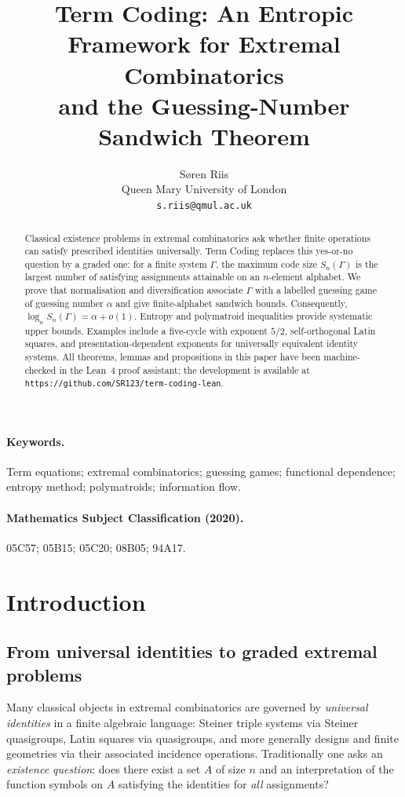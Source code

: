 \documentclass[11pt]{article}
\title{Term Coding: An Entropic Framework for Extremal Combinatorics\\
and the Guessing-Number Sandwich Theorem}
\author{S{\o}ren Riis\\
Queen Mary University of London\\
\texttt{s.riis@qmul.ac.uk}}
\date{}
\theoremstyle{plain}
\theoremstyle{definition}
\theoremstyle{definition}
\theoremstyle{remark}
\newcommand{\A}{A}
\newcommand{\Sn}{S_n}
\begin{document}
\maketitle

\begin{abstract}
Classical existence problems in extremal combinatorics ask whether finite operations can satisfy prescribed
identities universally. Term Coding replaces this yes-or-no question by a graded one: for a finite system $\Gamma$,
the maximum code size $\Sn(\Gamma)$ is the largest number of satisfying assignments attainable on an $n$-element
alphabet. We prove that normalisation and diversification associate $\Gamma$ with a labelled guessing game of
guessing number $\alpha$ and give finite-alphabet sandwich bounds. Consequently,
$\log_n \Sn(\Gamma)=\alpha+o(1)$. Entropy and polymatroid inequalities provide systematic upper bounds.
Examples include a five-cycle with exponent $5/2$, self-orthogonal Latin squares, and presentation-dependent
exponents for universally equivalent identity systems.
All theorems, lemmas and propositions in this paper have been machine-checked in the Lean~4
proof assistant; the development is available at
\nolinkurl{https://github.com/SR123/term-coding-lean}.
\end{abstract}

\paragraph{Keywords.}
Term equations; extremal combinatorics; guessing games; functional dependence; entropy method; polymatroids;
information flow.

\paragraph{Mathematics Subject Classification (2020).}
05C57; 05B15; 05C20; 08B05; 94A17.

\section{Introduction}
\label{sec:intro}

\subsection{From universal identities to graded extremal problems}

Many classical objects in extremal combinatorics are governed by \emph{universal identities} in a
finite algebraic language: Steiner triple systems via Steiner quasigroups, Latin squares via quasigroups,
and more generally designs and finite geometries via their associated incidence operations.
Traditionally one asks an \emph{existence question}: does there exist a set $\A$ of size $n$ and an
interpretation of the function symbols on $\A$ satisfying the identities for \emph{all} assignments?
\end{document}
